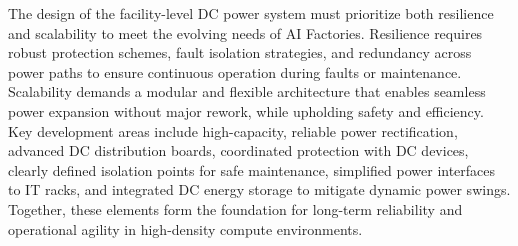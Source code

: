 The design of the facility-level DC power system must prioritize both resilience and scalability to meet the evolving needs of AI Factories. Resilience requires robust protection schemes, fault isolation strategies, and redundancy across power paths to ensure continuous operation during faults or maintenance. Scalability demands a modular and flexible architecture that enables seamless power expansion without major rework, while upholding safety and efficiency. Key development areas include high-capacity, reliable power rectification, advanced DC distribution boards, coordinated protection with DC devices, clearly defined isolation points for safe maintenance, simplified power interfaces to IT racks, and integrated DC energy storage to mitigate dynamic power swings. Together, these elements form the foundation for long-term reliability and operational agility in high-density compute environments.
